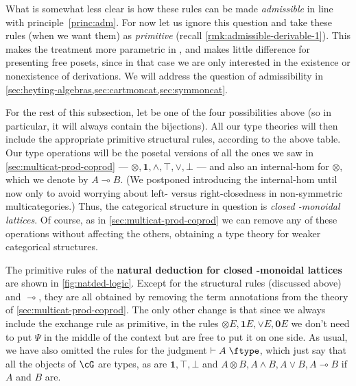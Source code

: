 \documentclass{book}
\let\types\vdash
\def\type{\;\ftype}
\let\meet\wedge
\let\join\vee
\def\joinE{\mathord{\join}E}
\def\zero{\mathbf{0}}
\def\one{\mathbf{1}}
\let\tensor\otimes
\def\tensorE{\mathord{\tensor}E}
\let\hom\multimap
\begin{document}
What is somewhat less clear is how these rules can be made \emph{admissible} in line with principle~\eqref{princ:adm}.
For now let us ignore this question and take these rules (when we want them) as \emph{primitive} (recall \cref{rmk:admissible-derivable-1}).
This makes the treatment more parametric in \fS, and makes little difference for presenting free posets, since in that case we are only interested in the existence or nonexistence of derivations.
We will address the question of admissibility in \cref{sec:heyting-algebras,sec:cartmoncat,sec:symmoncat}.

For the rest of this subsection, let \fS be one of the four possibilities above (so in particular, it will always contain the bijections).
All our type theories will then include the appropriate primitive structural rules, according to the above table.
Our type operations will be the posetal versions of all the ones we saw in \cref{sec:multicat-prod-coprod} --- $\tensor,\one,\meet,\top,\join,\bot$ --- and also an internal-hom for $\tensor$, which we denote by $A\hom B$.
(We postponed introducing the internal-hom until now only to avoid worrying about left- versus right-closedness in non-symmetric multicategories.)
Thus, the categorical structure in question is \emph{closed \fS-monoidal lattices}.
Of course, as in \cref{sec:multicat-prod-coprod} we can remove any of these operations without affecting the others, obtaining a type theory for weaker categorical structures.

The primitive rules of the \textbf{natural deduction for closed \fS-monoidal lattices} are shown in \cref{fig:natded-logic}.
Except for the structural rules (discussed above) and $\hom$, they are all obtained by removing the term annotations from the theory of \cref{sec:multicat-prod-coprod}.
The only other change is that since we always include the exchange rule as primitive, in the rules $\tensorE,\one E,\joinE,\zero E$ we don't need to put $\Psi$ in the middle of the context but are free to put it on one side.
As usual, we have also omitted the rules for the judgment $\types A\type$, which just say that all the objects of $\cG$ are types, as are $\one,\top,\bot$ and $A\tensor B, A\meet B, A\join B, A\hom B$ if $A$ and $B$ are.
\end{document}
